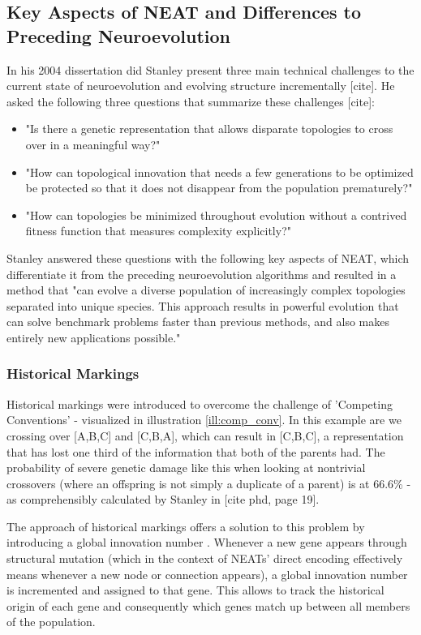\documentclass[journal, a4paper]{IEEEtran}
\begin{document}
\subsection{Key Aspects of NEAT and Differences to Preceding Neuroevolution}

In his 2004 dissertation did Stanley present three main technical challenges to the current state of neuroevolution and evolving structure incrementally [cite]. He asked the following three questions that summarize these challenges [cite]:

\begin{itemize}
    \item "Is there a genetic representation that allows disparate topologies to cross over in a meaningful way?"
    \item "How can topological innovation that needs a few generations to be optimized be protected so that it does not disappear from the population prematurely?"
    \item "How can topologies be minimized throughout evolution without a contrived fitness function that measures complexity explicitly?"
\end{itemize}

Stanley answered these questions with the following key aspects of NEAT, which differentiate it from the preceding neuroevolution algorithms and resulted in a method that "can evolve a diverse population of increasingly complex topologies separated into unique species. This approach results in powerful evolution that can solve benchmark problems faster than previous methods, and also makes entirely new applications possible."



\subsubsection{Historical Markings}

Historical markings were introduced to overcome the challenge of 'Competing Conventions' - visualized in illustration \ref{ill:comp_conv}. In this example are we crossing over [A,B,C] and [C,B,A], which can result in [C,B,C], a representation that has lost one third of the information that both of the parents had. The probability of severe genetic damage like this when looking at nontrivial crossovers (where an offspring is not simply a duplicate of a parent) is at 66.6\% - as comprehensibly calculated by Stanley in [cite phd, page 19].

The approach of historical markings offers a solution to this problem by introducing a global innovation number . Whenever a new gene appears through structural mutation (which in the context of NEATs' direct encoding effectively means whenever a new node or connection appears), a global innovation number is incremented and assigned to that gene. This allows to track the historical origin of each gene and consequently which genes match up between all members of the population.
\end{document}
